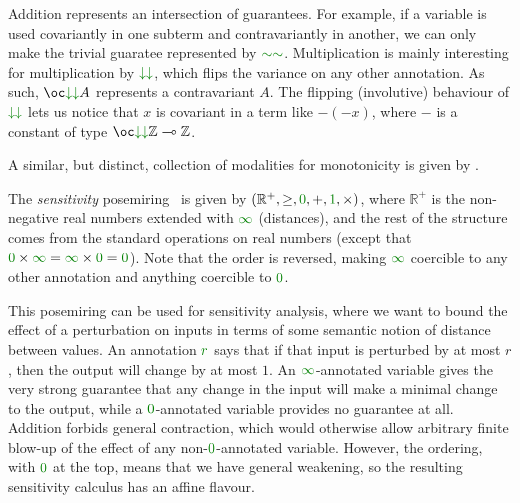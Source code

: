 \begin{example}
{
  }

  Addition represents an intersection of guarantees.
  For example, if a variable is used covariantly in one subterm and
  contravariantly in another, we can only make the trivial guaratee represented
  by $\gr{\sim\sim}$.
  Multiplication is mainly interesting for multiplication by
  $\gr{\downarrow\downarrow}$, which flips the variance on any other annotation.
  As such, $\oc\gr{\downarrow\downarrow}A$ represents a contravariant $A$.
  The flipping (involutive) behaviour of $\gr{\downarrow\downarrow}$ lets us
  notice that $x$ is covariant in
  a term like $-(-x)$, where $-$ is a constant of type
  $\oc\gr{\downarrow\downarrow}\mathbb Z \multimap \mathbb Z$.

  A similar, but distinct, collection of modalities for monotonicity is given by
  \citet{Arntzenius19}.
\end{example}

\begin{example}\label{def:sensitivity-posemiring}
  The \emph{sensitivity} posemiring~\citep{reed10distance} is given by
  $(\mathbb R^+, \geq, \gr0, +, \gr1, \times)$, where $\mathbb R^+$ is the
  non-negative real numbers extended with $\gr\infty$ (distances), and the rest
  of the structure comes from the standard operations on real numbers (except
  that $\gr0 \times \gr\infty = \gr\infty \times \gr0 = \gr0$).
  Note that the order is reversed, making $\gr\infty$ coercible to any other
  annotation and anything coercible to $\gr0$.

  This posemiring can be used for sensitivity analysis, where we want to bound
  the effect of a perturbation on inputs in terms of some semantic notion of
  distance between values.
  An annotation $\gr r$ says that if that input is perturbed by at most $r$,
  then the output will change by at most $1$.
  An $\gr\infty$-annotated variable gives the very strong guarantee that any
  change in the input will make a minimal change to the output, while a
  $\gr0$-annotated variable provides no guarantee at all.
  Addition forbids general contraction, which would otherwise allow arbitrary
  finite blow-up of the effect of any non-$\gr0$-annotated variable.
  However, the ordering, with $\gr0$ at the top, means that we have general
  weakening, so the resulting sensitivity calculus has an affine flavour.
\end{example}
